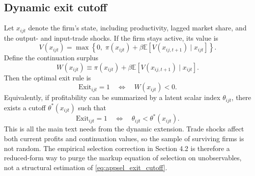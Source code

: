 \subsection{Dynamic exit cutoff}

Let $x_{ijt}$ denote the firm's state, including productivity, lagged market share, and the output- and input-trade shocks. If the firm stays active, its value is
\begin{equation}
V(x_{ijt})
=
\max
\left\{
0,\;
\pi(x_{ijt}) + \beta \mathbb{E}\left[V(x_{ij,t+1}) \mid x_{ijt}\right]
\right\}.
\label{eq:appsel_bellman}
\end{equation}
Define the continuation surplus
\[
W(x_{ijt})
\equiv
\pi(x_{ijt}) + \beta \mathbb{E}\left[V(x_{ij,t+1}) \mid x_{ijt}\right].
\]
Then the optimal exit rule is
\begin{equation}
\text{Exit}_{ijt}=1
\quad \Longleftrightarrow \quad
W(x_{ijt})<0.
\label{eq:appsel_exit_rule}
\end{equation}
Equivalently, if profitability can be summarized by a latent scalar index $\theta_{ijt}$, there exists a cutoff $\theta^*(x_{ijt})$ such that
\begin{equation}
\text{Exit}_{ijt}=1
\quad \Longleftrightarrow \quad
\theta_{ijt}<\theta^*(x_{ijt}).
\label{eq:appsel_exit_cutoff}
\end{equation}
This is all the main text needs from the dynamic extension. Trade shocks affect both current profits and continuation values, so the sample of surviving firms is not random. The empirical selection correction in Section 4.2 is therefore a reduced-form way to purge the markup equation of selection on unobservables, not a structural estimation of \eqref{eq:appsel_exit_cutoff}.
